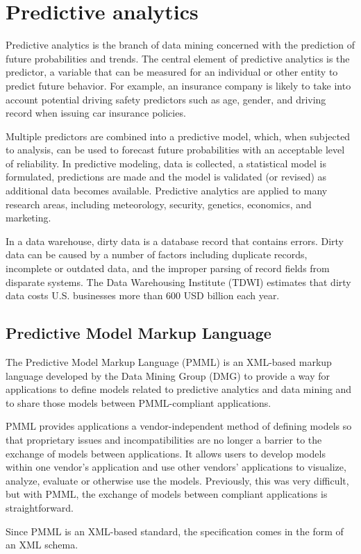 \section{Predictive analytics}


Predictive analytics is the branch of data mining concerned with the prediction of future probabilities and trends. The central element of predictive analytics is the predictor, a variable that can be measured for an individual or other entity to predict future behavior. For example, an insurance company is likely to take into account potential driving safety predictors such as age, gender, and driving record when issuing car insurance policies.


Multiple predictors are combined into a predictive model, which, when subjected to analysis, can be used to forecast future probabilities with an acceptable level of reliability. In predictive modeling, data is collected, a statistical model is formulated, predictions are made and the model is validated (or revised) as additional data becomes available. Predictive analytics are applied to many research areas, including meteorology, security, genetics, economics, and marketing.


In a data warehouse, dirty data is a database record that contains errors. Dirty data can be caused by a number of factors including duplicate records, incomplete or outdated data, and the improper parsing of record fields from disparate systems. The Data Warehousing Institute (TDWI) estimates that dirty data costs U.S. businesses more than 600 USD billion each year.
\subsection{Predictive Model Markup Language}


The Predictive Model Markup Language (PMML) is an XML-based markup language developed by the Data Mining Group (DMG) to provide a way for applications to define models related to predictive analytics and data mining and to share those models between PMML-compliant applications.


PMML provides applications a vendor-independent method of defining models so that proprietary issues and incompatibilities are no longer a barrier to the exchange of models between applications. It allows users to develop models within one vendor's application and use other vendors' applications to visualize, analyze, evaluate or otherwise use the models. Previously, this was very difficult, but with PMML, the exchange of models between compliant applications is straightforward.

Since PMML is an XML-based standard, the specification comes in the form of an XML schema.

